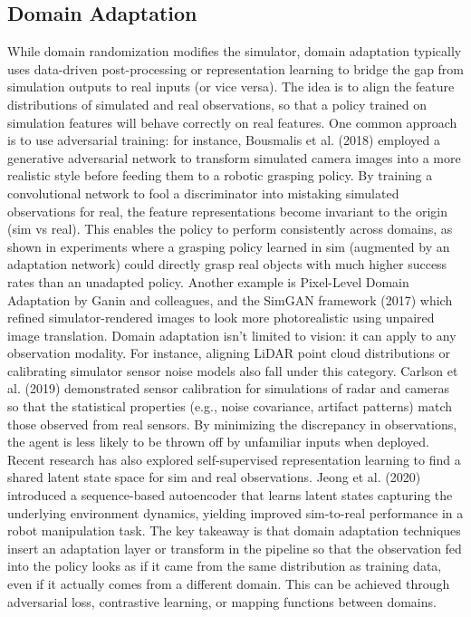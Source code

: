 \subsection{Domain Adaptation}
While domain randomization modifies the simulator, domain adaptation typically uses data-driven post-processing or representation learning to bridge the gap from simulation outputs to real inputs (or vice versa). The idea is to align the feature distributions of simulated and real observations, so that a policy trained on simulation features will behave correctly on real features. One common approach is to use adversarial training: for instance, Bousmalis et al. (2018) employed a generative adversarial network to transform simulated camera images into a more realistic style before feeding them to a robotic grasping policy. By training a convolutional network to fool a discriminator into mistaking simulated observations for real, the feature representations become invariant to the origin (sim vs real). This enables the policy to perform consistently across domains, as shown in experiments where a grasping policy learned in sim (augmented by an adaptation network) could directly grasp real objects with much higher success rates than an unadapted policy. Another example is Pixel-Level Domain Adaptation by Ganin and colleagues, and the SimGAN framework (2017) which refined simulator-rendered images to look more photorealistic using unpaired image translation. Domain adaptation isn’t limited to vision: it can apply to any observation modality. For instance, aligning LiDAR point cloud distributions or calibrating simulator sensor noise models also fall under this category. Carlson et al. (2019) demonstrated sensor calibration for simulations of radar and cameras so that the statistical properties (e.g., noise covariance, artifact patterns) match those observed from real sensors. By minimizing the discrepancy in observations, the agent is less likely to be thrown off by unfamiliar inputs when deployed. Recent research has also explored self-supervised representation learning to find a shared latent state space for sim and real observations. Jeong et al. (2020) introduced a sequence-based autoencoder that learns latent states capturing the underlying environment dynamics, yielding improved sim-to-real performance in a robot manipulation task. The key takeaway is that domain adaptation techniques insert an adaptation layer or transform in the pipeline so that the observation fed into the policy looks as if it came from the same distribution as training data, even if it actually comes from a different domain. This can be achieved through adversarial loss, contrastive learning, or mapping functions between domains.

